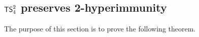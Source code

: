 \documentclass{amsart}
\newtheorem{corollary}[theorem]{Corollary}
\theoremstyle{definition}
\theoremstyle{remark}
\numberwithin{equation}{section}
\theoremstyle{noparens}
\def\propertyL{2-hyperimmunity}
\def\hyper{2-hyperimmune}
\newcommand{\Nb}{\mathbb{N}}
\newcommand{\Hcal}{\mathcal{H}}
\newcommand{\Rcal}{\mathcal{R}}
\newcommand{\s}[1]{\ensuremath{\sf{#1}}}
\DeclareMathOperator{\ts}{\s{TS}}
\DeclareMathOperator{\semo}{\s{SEM}}
\begin{document}


\subsection{$\ts^2_4$ preserves \propertyL}\label{subsect:ts24-preserves}
The purpose of this section is to prove the following theorem.
\end{document}
